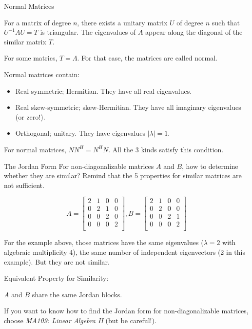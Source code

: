 \documentclass{beamer}
\begin{document}
\begin{frame}{Normal Matrices}
\begin{theorem}
    For a matrix of degree $n$, there exists a unitary matrix $U$ of degree $n$ such that $U^{-1}AU=T$ is triangular. The eigenvalues of $A$ appear along the diagonal of the similar matrix $T$.
\end{theorem}

For some matrics, $T=\varLambda$. For that case, the matrices are called normal.

\vspace{3pt}
Normal matrices contain:
\begin{itemize}
    \item Real symmetric; Hermitian. They have all real eigenvalues.
    \item Real skew-symmetric; skew-Hermitian. They have all imaginary eigenvalues (or zero!).
    \item Orthogonal; unitary. They have eigenvalues $|\lambda|=1$.
\end{itemize}

For normal matrices, $NN^H=N^HN$. All the 3 kinds satisfy this condition.

\end{frame}


\begin{frame}{The Jordan Form}
For non-diagonalizable matrices $A$ and $B$, how to determine whether they are similar? Remind that the 5 properties for similar matrices are not sufficient.

\begin{equation*}
    A=\left[ \begin{matrix}
        2&		1&		0&		0\\
        0&		2&		1&		0\\
        0&		0&		2&		0\\
        0&		0&		0&		2\\
    \end{matrix} \right] , B=\left[ \begin{matrix}
        2&		1&		0&		0\\
        0&		2&		0&		0\\
        0&		0&		2&		1\\
        0&		0&		0&		2\\
    \end{matrix} \right]
\end{equation*}

For the example above, those matrices have the same eigenvalues ($\lambda =2$ with algebraic multiplicity 4), the same number of independent eigenvectors (2 in this example). But they are not similar.

\vspace{3pt}
Equivalent Property for Similarity:
\begin{center}
    $A$ and $B$ share the same Jordan blocks.
\end{center}

If you want to know how to find the Jordan form for non-diagonalizable matrices, choose \emph{MA109: Linear Algebra II} (but be careful!).
\end{frame}
\end{document}
